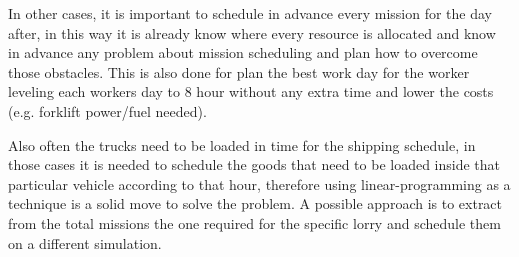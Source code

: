 In other cases, it is important to schedule in advance every mission for the day after, in this way it is already know where every resource is allocated and know in advance any problem about mission scheduling and plan how to overcome those obstacles. This is also done for plan the best work day for the worker leveling each workers day to 8 hour without any extra time and lower the costs (e.g. forklift power/fuel needed).

Also often the trucks need to be loaded in time for the shipping schedule, in those cases it is needed to schedule the goods that need to be loaded inside that particular vehicle according to that hour, therefore using linear-programming as a technique is a solid move to solve the problem. A possible approach is to extract from the total missions the one required for the specific lorry and schedule them on a different simulation.